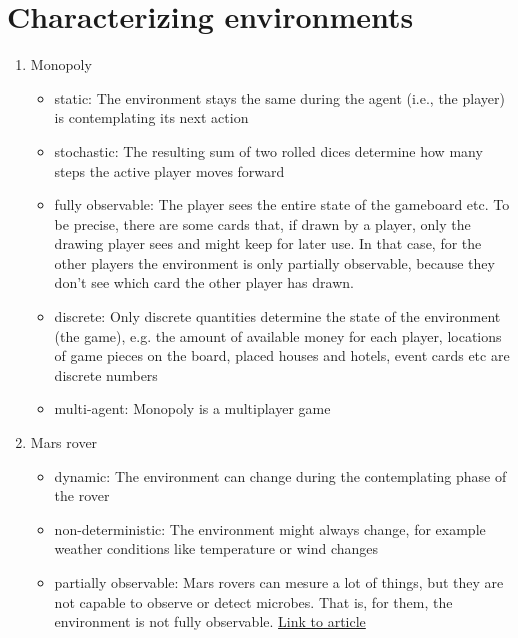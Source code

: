 \documentclass{article} %
\begin{document}
\section{Characterizing environments}


\begin{enumerate}
    \item Monopoly
    \begin{itemize}
        \item static: The environment stays the same during the agent
        (i.e., the player) is contemplating its next action
        \item stochastic: The resulting sum of two rolled dices
        determine how many steps the active player moves forward
        \item fully observable: The player sees the entire state
        of the gameboard etc. To be precise, there are some cards
        that, if drawn by a player, only the drawing player sees and
        might keep for later use. In that case, for the other players
        the environment is only partially observable, because they
        don't see which card the other player has drawn.
        \item discrete: Only discrete quantities determine the state
        of the environment (the game), e.g. the amount of 
        available money for each player, locations of game pieces
        on the board, placed houses and hotels, event cards etc
        are discrete numbers
        \item multi-agent: Monopoly is a multiplayer game
    \end{itemize}
    \item Mars rover
    \begin{itemize}
        \item dynamic: The environment can change during the
        contemplating phase of the rover
        \item non-deterministic: The environment might always change,
        for example weather conditions like temperature or wind changes
        \item partially observable: Mars rovers can mesure a lot of
        things, but they are not capable to observe or detect
        microbes. That is, for them, the environment is not
        fully observable.
        \href{https://t3n.de/news/leben-mars-rover-sensoren-ungenau-1536159/}{Link to article}
    \end{itemize}
\end{enumerate}
\end{document}
